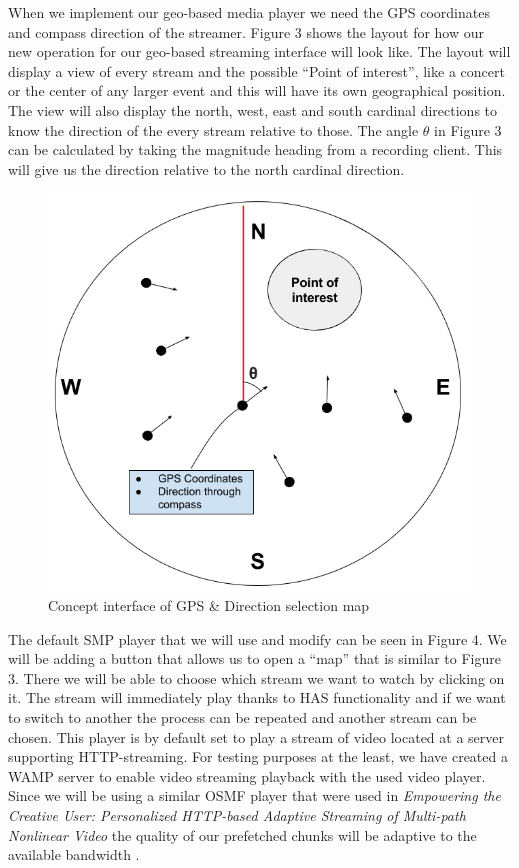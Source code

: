 \documentclass[9pt,a4paper]{acmproc}
\begin{document}
When we implement our geo-based media player we need the GPS coordinates and compass direction of the streamer. Figure 3 shows the layout for how our new operation for our geo-based streaming interface will look like. The layout will display a view of every stream and the possible “Point of interest”, like a concert or the center of any larger event and this will have its own geographical position. The view will also display the north, west, east and south cardinal directions to know the direction of the every stream relative to those. The angle $\theta$ in Figure 3 can be calculated by taking the magnitude heading from a recording client. This will give us the direction relative to the north cardinal direction.

\begin{figure}[h!]
\begin{center}
	\includegraphics[scale=0.51]{teomet.png}
	\caption{Concept interface of GPS \& Direction selection map}
\end{center}
\end{figure}


The default SMP player that we will use and modify can be seen in Figure 4. We will be adding a button that allows us to open a “map” that is similar to Figure 3. There we will be able to choose which stream we want to watch by clicking on it. The stream will immediately play thanks to HAS functionality and if we want to switch to another the process can be repeated and another stream can be chosen. This player is by default set to play a stream of video located at a server supporting HTTP-streaming. For testing purposes at the least, we have created a WAMP server to enable video streaming playback with the used video player. Since we will be using a similar OSMF player that were used in \textit{Empowering the Creative User: Personalized HTTP-based Adaptive Streaming of Multi-path Nonlinear Video} the quality of our prefetched chunks will be adaptive to the available bandwidth \cite[s.~591-596]{hasmultipath}.
\end{document}
